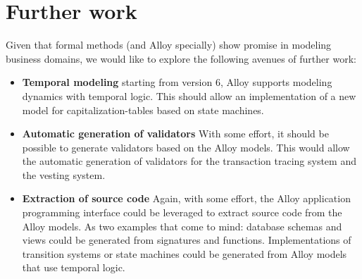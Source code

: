\section{Further work}

Given that formal methods (and Alloy specially) show promise in modeling business domains, we would like to explore the following avenues of further work:

\begin{itemize}
	\item\textbf{Temporal modeling} starting from version 6, Alloy supports modeling dynamics with temporal logic. This should allow an implementation of a new model for \glspl{capitalization-table} based on state machines.
	\item\textbf{Automatic generation of validators} With some effort, it should be possible to generate validators based on the Alloy models. This would allow the automatic generation of validators for the transaction tracing system and the vesting system.
	\item\textbf{Extraction of source code} Again, with some effort, the Alloy application programming interface could be leveraged to extract source code from the Alloy models. As two examples that come to mind: database schemas and views could be generated from signatures and functions. Implementations of transition systems or state machines could be generated from Alloy models that use temporal logic.
\end{itemize}